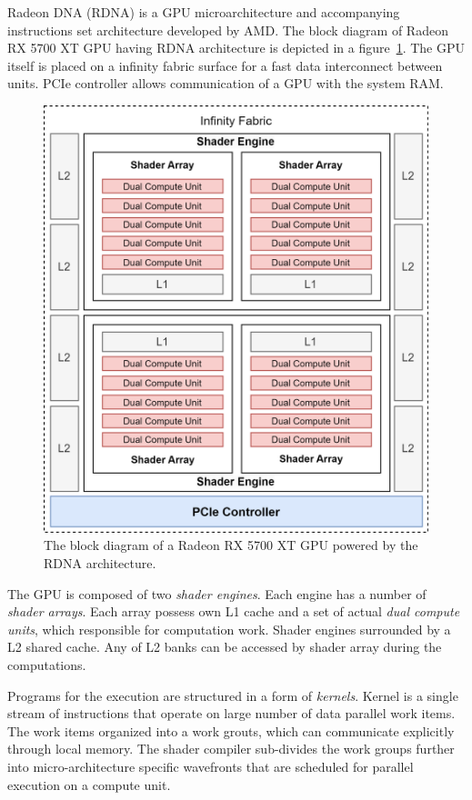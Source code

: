 Radeon DNA (RDNA) is a GPU microarchitecture and accompanying instructions set architecture developed by AMD. The block diagram of Radeon RX 5700 XT GPU having RDNA architecture is depicted in a figure~\ref{fig:rdna_gpu}. The GPU itself is placed on a infinity fabric surface for a fast data interconnect between units. PCIe controller allows communication of a GPU with the system RAM. 

\begin{figure}
    \centering
    \includegraphics[width=1.0\textwidth]{images/rdna_gpu.png}
    \caption{The block diagram of a Radeon RX 5700 XT GPU powered by the RDNA architecture.}
    \label{fig:rdna_gpu}
\end{figure}

The GPU is composed of two \textit{shader engines}. Each engine has a number of \textit{shader arrays}. Each array possess own L1 cache and a set of actual \textit{dual compute units}, which responsible for computation work. Shader engines surrounded by a L2 shared cache. Any of L2 banks can be accessed by shader array during the computations.

Programs for the execution are structured in a form of \textit{kernels}. Kernel is a single stream of instructions that operate on large number of data parallel work items. The work items organized into a work grouts, which can communicate explicitly through local memory. The shader compiler sub-divides the work groups further into micro-architecture specific wavefronts that are scheduled for parallel execution on a compute unit.


